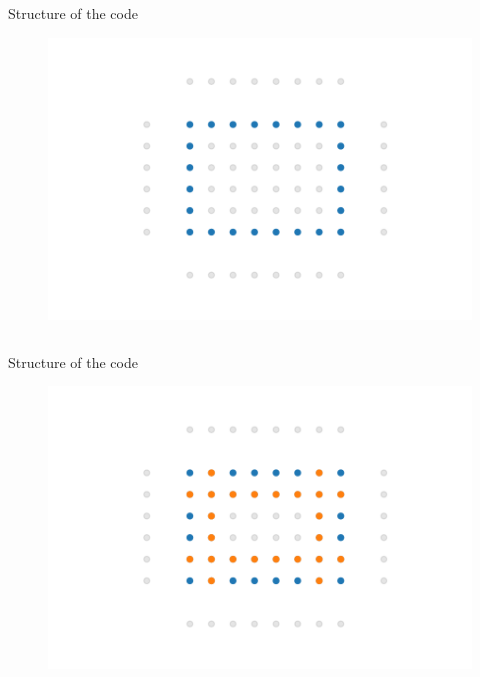 \documentclass[aspectratio=169]{beamer}
\begin{document}

\begin{frame}{Structure of the code}
    \vspace{-0.8cm}
    \begin{figure}
        \centering
        \includegraphics[width=0.8\linewidth]{Figures/step2.pdf}
    \end{figure}
    \vspace{-1.2cm}
    \inputminted[firstline=6, lastline=7,tabsize=4,fontsize=\footnotesize,framesep=2mm,bgcolor=codebgcolor,breaklines,linenos]{c}{../core.c}
\end{frame}


\begin{frame}{Structure of the code}
    \vspace{-0.8cm}
    \begin{figure}
        \centering
        \includegraphics[width=0.8\linewidth]{Figures/step3.pdf}
    \end{figure}
    \vspace{-1.2cm}
    \inputminted[firstline=9, lastline=9,tabsize=4,fontsize=\footnotesize,framesep=2mm,bgcolor=codebgcolor,breaklines,linenos]{c}{../core.c}
\end{frame}
\end{document}
